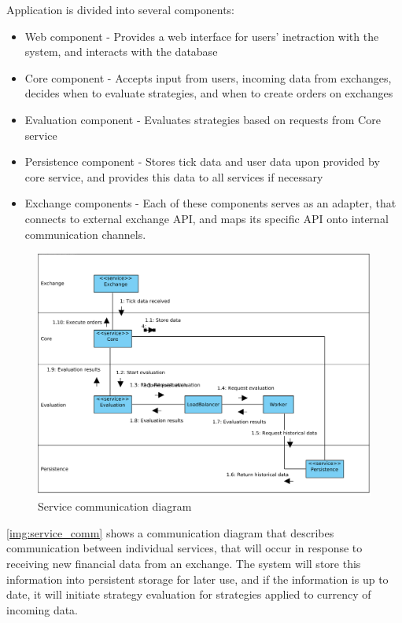 Application is divided into several components:
\begin{itemize}
    \item Web component - Provides a web interface for users' inetraction with the system, and interacts with the database
    \item Core component - Accepts input from users, incoming data from exchanges, decides when to evaluate strategies, and when to create orders on exchanges
    \item Evaluation component - Evaluates strategies based on requests from Core service
    \item Persistence component - Stores tick data and user data upon provided by core service, and provides this data to all services if necessary
    \item Exchange components - Each of these components serves as an adapter, that connects to external exchange API, and
    maps its specific API onto internal communication channels.
\end{itemize}

\begin{figure}[H]
    \includegraphics[width=\textwidth]{obrazky-figures/Service communication diagram.png}
    \caption{Service communication diagram}
    \label{img:service_comm}
\end{figure}

\autoref{img:service_comm} shows a communication diagram that describes communication between individual services, that
will occur in response to receiving new financial data from an exchange. The system will store this information
into persistent storage for later use, and if the information is up to date, it will initiate strategy evaluation
for strategies applied to currency of incoming data.

